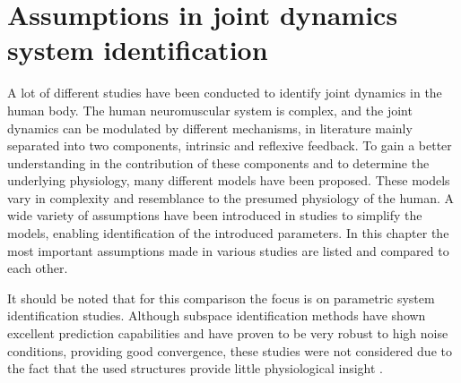 


\chapter{Assumptions in joint dynamics system identification}
\label{chap:assumptions}
A lot of different studies have been conducted to identify joint dynamics in the human body. The human neuromuscular system is complex, and the joint dynamics can be modulated by different mechanisms, in literature mainly separated into two components, intrinsic and reflexive feedback. To gain a better understanding in the contribution of these components and to determine the underlying physiology, many different models have been proposed. These models vary in complexity and resemblance to the presumed physiology of the human. A wide variety of assumptions have been introduced in studies to simplify the models, enabling identification of the introduced parameters. In this chapter the most important assumptions made in various studies are listed and compared to each other.

It should be noted that for this comparison the focus is on parametric system identification studies. Although subspace identification methods have shown excellent prediction capabilities and have proven to be very robust to high noise conditions, providing good convergence, these studies were not considered due to the fact that the used structures provide little physiological insight \cite{jalaleddini_subspace_2017}. 


